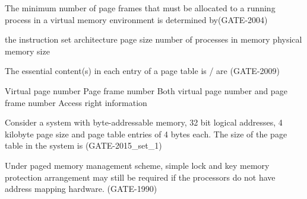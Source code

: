 
\begin{questyle}

  \question  The minimum number of page frames that must be allocated to a running process in a virtual memory
            environment is determined by(GATE-2004)

  \begin{choices}
    \correctchoice the instruction set architecture
    \choice page size
    \choice number of processes in memory
    \choice physical memory size
  \end{choices}

\end{questyle}


\begin{questyle}

  \question  The essential content(s) in each entry of a page table is / are (GATE-2009)

  \begin{choices}
    \choice Virtual page number
    \correctchoice Page frame number
    \choice Both virtual page number and page frame number
    \choice Access right information
  \end{choices}

\end{questyle}


\begin{questyle}

  \question  Consider a system with byte-addressable memory, 32 bit logical addresses, 4 kilobyte page size and page table entries of 4 bytes each. The size of the page table in the system is \fillin[4 MB] (GATE-2015\_set\_1)

\end{questyle}


\begin{questyle}

  \question  Under paged memory management scheme, simple lock and key memory protection arrangement may still be required if the \fillin[] processors do not have address mapping hardware. (GATE-1990)

\end{questyle}

